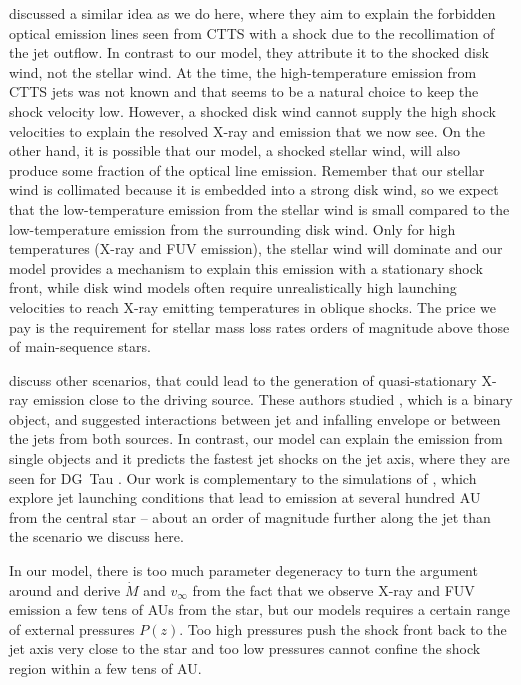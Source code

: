 \documentclass[manuscript]{aastex}
\begin{document}
\citet{1993ApJ...409..748G} discussed a similar idea as we do here, where they aim to explain the forbidden optical emission lines seen from CTTS with a shock due to the recollimation of the jet outflow. In contrast to our model, they attribute it to the shocked disk wind, not the stellar wind. At the time, the high-temperature emission from CTTS jets was not known and that seems to be a natural choice to keep the shock velocity low. However, a shocked disk wind cannot supply the high shock velocities to explain the resolved X-ray and  emission that we now see. On the other hand, it is possible that our model, a shocked stellar wind, will also produce some fraction of the optical line emission.
Remember that our stellar wind is collimated because it is embedded into a strong disk wind, so we expect that the low-temperature emission from the stellar wind is small compared to the low-temperature emission from the surrounding disk wind. Only for high temperatures (X-ray and FUV emission), the stellar wind will dominate and our model provides a mechanism to explain this emission with a stationary shock front, while disk wind models often require unrealistically high launching velocities to reach X-ray emitting temperatures in oblique shocks. The price we pay is the requirement for stellar mass loss rates orders of magnitude above those of main-sequence stars.

\citet{2003ApJ...584..843B} discuss other scenarios, that could lead to the generation of quasi-stationary X-ray emission close to the driving source. These authors studied , which is a binary object, and suggested interactions between jet and infalling envelope or between the jets from both sources. In contrast, our model can explain the emission from single objects and it predicts the fastest jet shocks on the jet axis, where they are seen for DG~Tau \citep{2013A&A...550L...1S}. Our work is complementary to the simulations of \citet{2010A&A...511A..42B,2010A&A...517A..68B,2011ApJ...737...54B}, which explore jet launching conditions that lead to emission at several hundred AU from the central star -- about an order of magnitude further along the jet than the scenario we discuss here.

In our model, there is too much parameter degeneracy to turn the argument around and derive $\dot M$ and  $v_\infty$ from the fact that we observe X-ray and FUV emission a few tens of AUs from the star, but our models requires a certain range of external pressures $P(z)$. Too high pressures push the shock front back to the jet axis very close to the star and too low pressures cannot confine the shock region within a few tens of AU.
\end{document}
